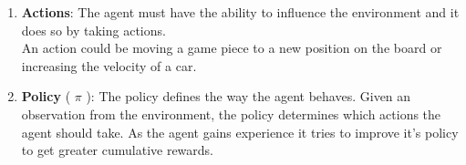 \begin{enumerate}[itemsep=5pt]
    \item \textbf{Actions}: The agent must have the ability to influence the environment and it does so by taking actions.\\ An action could be moving a game piece to a new position on the board or increasing the velocity of a car.

    \item \textbf{Policy} ( $\pi$ ): The policy defines the way the agent behaves. Given an observation from the environment, the policy determines which actions the agent should take. As the agent gains experience it tries to improve it’s policy to get greater cumulative rewards.
\end{enumerate}



































